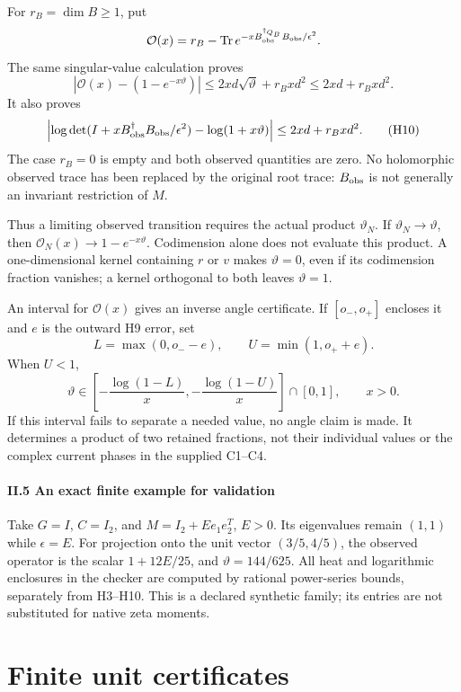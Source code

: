 \documentclass[11pt]{article}
\begin{document}
For \(r_B=\dim B\ge1\), put \[
 \mathcal O(x)=r_B-\operatorname{Tr}
 e^{-x B_{\rm obs}^{\dagger_{Q_B}}B_{\rm obs}/\epsilon^2}.
\] The same singular-value calculation proves \[
 \boxed{|\mathcal O(x)-(1-e^{-x\vartheta})|
 \le2xd\sqrt\vartheta+r_Bx d^2
 \le2xd+r_Bxd^2.}
 \tag{H9}
\] It also proves \[
 \left|\log\det(I+xB_{\rm obs}^\dagger B_{\rm obs}/\epsilon^2)
 -\log(1+x\vartheta)\right|\le2xd+r_Bxd^2.
 \tag{H10}
\] The case \(r_B=0\) is empty and both observed quantities are zero. No holomorphic observed trace has been replaced by the original root trace: \(B_{\rm obs}\) is not generally an invariant restriction of \(M\).

Thus a limiting observed transition requires the actual product \(\vartheta_N\). If \(\vartheta_N\to\vartheta\), then \(\mathcal O_N(x)\to1-e^{-x\vartheta}\). Codimension alone does not evaluate this product. A one-dimensional kernel containing \(r\) or \(v\) makes \(\vartheta=0\), even if its codimension fraction vanishes; a kernel orthogonal to both leaves \(\vartheta=1\).

An interval for \(\mathcal O(x)\) gives an inverse angle certificate. If \([o_-,o_+]\) encloses it and \(e\) is the outward H9 error, set \[
 L=\max(0,o_--e),\qquad U=\min(1,o_++e).
\] When \(U<1\), \[
 \boxed{\vartheta\in
 \left[-\frac{\log(1-L)}x,-\frac{\log(1-U)}x\right]\cap[0,1],\qquad x>0.}
 \tag{H11}
\] If this interval fails to separate a needed value, no angle claim is made. It determines a product of two retained fractions, not their individual values or the complex current phases in the supplied C1--C4.

\subsection{II.5 An exact finite example for validation}\label{ii.5-an-exact-finite-example-for-validation}

Take \(G=I\), \(C=I_2\), and \(M=I_2+E e_1e_2^T\), \(E>0\). Its eigenvalues remain \((1,1)\) while \(\epsilon=E\). For projection onto the unit vector \((3/5,4/5)\), the observed operator is the scalar \(1+12E/25\), and \(\vartheta=144/625\). All heat and logarithmic enclosures in the checker are computed by rational power-series bounds, separately from H3--H10. This is a declared synthetic family; its entries are not substituted for native zeta moments.

\clearpage\part{Finite unit certificates}
\label{part:11}
\end{document}

